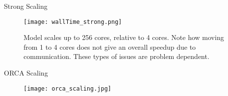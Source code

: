 \documentclass[pdf]{beamer}
\begin{document}
 \begin{frame}{Strong Scaling}

	\begin{figure}
	\centering
	\texttt{[image: wallTime\_strong.png]}
	\caption{Model scales up to 256 cores, relative to 4 cores. Note how moving from 1 to 4 cores does not give an overall speedup due to communication. These types of issues are problem dependent.}
	\end{figure}
 \end{frame}

 \begin{frame}{ORCA Scaling}
	\begin{figure}
	\centering
	\texttt{[image: orca\_scaling.jpg]}
	\end{figure}
 \end{frame}

%		
\end{document}
